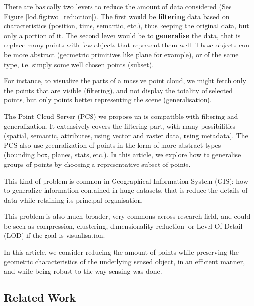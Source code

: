 		
		There are basically two levers to reduce the amount of data considered (See Figure \ref{lod.fig:two_reduction}). The first would be \textbf{filtering} data based on characteristics (position, time, semantic, etc.), thus keeping the original data, but only a portion of it.
		The second lever would be to \textbf{generalise} the data, that is replace many points with few objects that represent them well. Those objects can be more abstract (geometric primitives like plane for example), or of the same type, i.e. simply some well chosen points (subset).
		
		For instance, to visualize the parts of a massive point cloud, we might fetch only the points that are visible (filtering),
		and not display the totality of selected points, but only points better representing the scene (generalisation).
		
		The Point Cloud Server (PCS) we propose un \cite{cura2015} is compatible with filtering and generalization. It extensively covers the filtering part, with many possibilities (spatial, semantic, attributes, using vector and raster data, using metadata). The PCS also use geenralization of points in the form of more abstract types (bounding box, planes, stats, etc.).
		In this article, we explore how to generalise groups of points by choosing a representative subset of points.
		
		This kind of problem is common in Geographical Information System (GIS): how to generalize information contained in huge datasets, that is reduce the details of data while retaining its principal organisation.
		
		This problem is also much broader, very commons across research field, and could be seen as compression, clustering, dimensionality reduction, or Level Of Detail (LOD) if the goal is visualisation.
		
		In this article, we consider reducing the amount of points while preserving the geometric characteristics of the underlying sensed object, in an efficient manner, and while being robust to the way sensing was done.
		

	\subsection{Related Work} 
		
